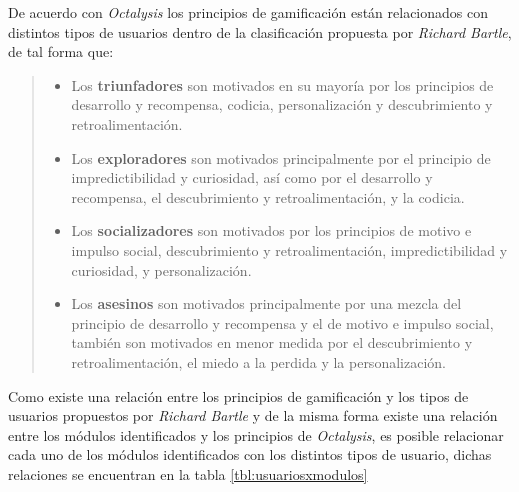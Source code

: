  \noindent
 De acuerdo con {\it Octalysis} \cite[p. 414]{Octalysis} los principios de
 gamificación están relacionados con distintos tipos de usuarios dentro de la
 clasificación propuesta por {\it Richard Bartle}, de tal forma que:

    \begin{quote}
    \begin{itemize}
        \item Los {\bf triunfadores} son motivados en su mayoría por
              los principios de desarrollo y recompensa, codicia,
              personalización y descubrimiento y retroalimentación.

        \item Los {\bf exploradores} son motivados principalmente por
              el principio de impredictibilidad y curiosidad, así como
              por el desarrollo y recompensa, el descubrimiento y
              retroalimentación, y la codicia.

        \item Los {\bf socializadores} son motivados por los principios
              de motivo e impulso social, descubrimiento y retroalimentación,
              impredictibilidad y curiosidad, y personalización.

        \item Los {\bf asesinos} son motivados principalmente por una mezcla
              del principio de desarrollo y recompensa y el de motivo e impulso
              social, también son motivados en menor medida por el descubrimiento
              y retroalimentación, el miedo a la perdida y la personalización.
    \end{itemize}
    \end{quote}

 \noindent
 Como existe una relación entre los principios de gamificación y los tipos de usuarios
 propuestos por {\it Richard Bartle} y de la misma forma existe una relación entre
 los módulos identificados y los principios de {\it Octalysis}, es posible relacionar
 cada uno de los módulos identificados con los distintos tipos de usuario, dichas
 relaciones se encuentran en la tabla \ref{tbl:usuariosxmodulos}

